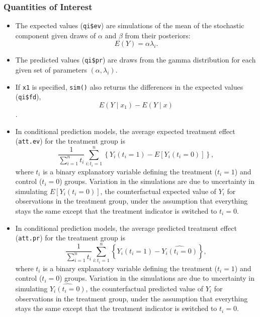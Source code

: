 \subsubsection{Quantities of Interest}

\begin{itemize}
\item The expected values ({\tt qi\$ev}) are simulations of the mean
  of the stochastic component given draws of $\alpha$ and
  $\beta$ from their posteriors:  $$E(Y) = \alpha \lambda_i.$$  
\item The predicted values ({\tt qi\$pr}) are draws from the gamma
  distribution for each given set of parameters $(\alpha, \lambda_i)$.
\item If {\tt x1} is specified, {\tt sim()} also returns the
  differences in the expected values ({\tt qi\$fd}), $$E(Y \mid x_1) -
  E(Y \mid x)$$.

\item In conditional prediction models, the average expected treatment
  effect ({\tt att.ev}) for the treatment group is 
    \begin{equation*} \frac{1}{\sum_{i=1}^n t_i}\sum_{i:t_i=1}^n \left\{ Y_i(t_i=1) -
      E[Y_i(t_i=0)] \right\},
    \end{equation*} 
    where $t_i$ is a binary explanatory variable defining the treatment
    ($t_i=1$) and control ($t_i=0$) groups.  Variation in the
    simulations are due to uncertainty in simulating $E[Y_i(t_i=0)]$,
    the counterfactual expected value of $Y_i$ for observations in the
    treatment group, under the assumption that everything stays the
    same except that the treatment indicator is switched to $t_i=0$.

\item In conditional prediction models, the average predicted treatment
  effect ({\tt att.pr}) for the treatment group is 
    \begin{equation*} \frac{1}{\sum_{i=1}^n t_i}\sum_{i:t_i=1}^n \left\{ Y_i(t_i=1) -
      \widehat{Y_i(t_i=0)} \right\},
    \end{equation*} 
    where $t_i$ is a binary explanatory variable defining the treatment
    ($t_i=1$) and control ($t_i=0$) groups.  Variation in the
    simulations are due to uncertainty in simulating
    $\widehat{Y_i(t_i=0)}$, the counterfactual predicted value of
    $Y_i$ for observations in the treatment group, under the
    assumption that everything stays the same except that the
    treatment indicator is switched to $t_i=0$.  

\end{itemize}

